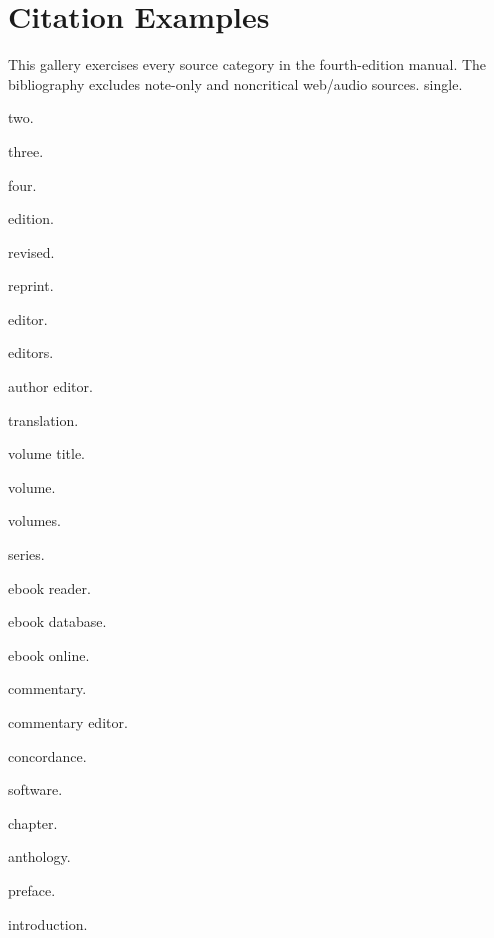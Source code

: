 \documentclass[font=termes]{mbts}
\begin{document}
\section{Citation Examples}
This gallery exercises every source category in the fourth-edition manual.
The bibliography excludes note-only and noncritical web/audio sources.
\noindent single.\autocite[12]{single}\par
\noindent two.\autocite[12]{two}\par
\noindent three.\autocite[12]{three}\par
\noindent four.\autocite[12]{four}\par
\noindent edition.\autocite[12]{edition}\par
\noindent revised.\autocite[12]{revised}\par
\noindent reprint.\autocite[12]{reprint}\par
\noindent editor.\autocite[12]{editor}\par
\newpage
\noindent editors.\autocite[12]{editors}\par
\noindent author editor.\autocite[12]{author-editor}\par
\noindent translation.\autocite[12]{translation}\par
\noindent volume title.\autocite[12]{volume-title}\par
\noindent volume.\autocite[12]{volume}\par
\noindent volumes.\autocite[2:12]{volumes}\par
\noindent series.\autocite[12]{series}\par
\noindent ebook reader.\autocite[12]{ebook-reader}\par
\newpage
\noindent ebook database.\autocite[12]{ebook-database}\par
\noindent ebook online.\autocite[12]{ebook-online}\par
\noindent commentary.\autocite[12]{commentary}\par
\noindent commentary editor.\autocite[5:12]{commentary-editor}\par
\noindent concordance.\autocite{concordance}\par
\noindent software.\autocite[12]{software}\par
\noindent chapter.\autocite[12]{chapter}\par
\noindent anthology.\autocite[12]{anthology}\par
\newpage
\noindent preface.\autocite[12]{preface}\par
\noindent introduction.\autocite[12]{introduction}\par
\end{document}
